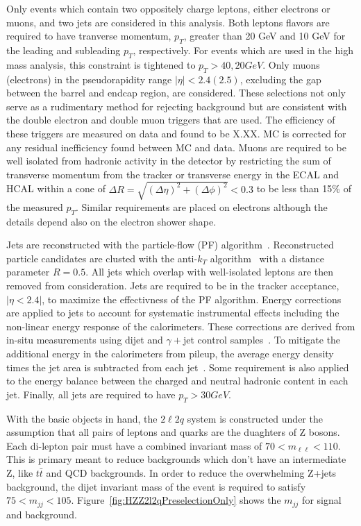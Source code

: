 Only events which contain two oppositely charge leptons, either electrons or
muons, and two jets are considered in this analysis.  Both leptons
flavors are required to have tranverse momentum, $p_T$, greater than 20 GeV
and 10 GeV for the leading and subleading $p_T$, respectively.  For events 
which are used in the high mass analysis, this constraint is tightened to 
$p_T>40, 20 GeV$.  Only muons (electrons) in the pseudorapidity range 
$|\eta|<2.4 (2.5)$, excluding the gap between the barrel and endcap region, 
are considered.  These selections not only serve as a rudimentary method for
rejecting background but are consistent with the double electron and 
double muon triggers that are used.  The efficiency of these triggers are 
measured on data and found to be X.XX.  MC is corrected for any residual 
inefficiency found between MC and data. Muons are required to be well 
isolated from hadronic activity in the detector by restricting the sum of
transverse momentum from the tracker or transverse energy in the ECAL and
HCAL within a cone of $\Delta R  = \sqrt{(\Delta\eta)^2+(\Delta\phi)^2}<0.3$
to be less than 15\% of the measured $p_T$.  Similar requirements are placed
on electrons although the details depend also on the electron shower shape.

Jets are reconstructed with the particle-flow (PF) algorithm~\cite{???}.
Reconstructed particle  candidates are clusted with the anti-$k_T$ 
algorithm~\cite{???} with a distance parameter $R=0.5$.  All jets which 
overlap with well-isolated leptons are then removed from consideration.  
Jets are required to be in the tracker acceptance, $|\eta<2.4|$, to maximize
the effectivness of the PF algorithm.  Energy corrections  are applied
to jets to account for systematic instrumental effects including the 
non-linear energy response of the calorimeters.  These corrections are 
derived from in-situ measurements using dijet and $\gamma+$jet control
samples~\cite{???}. To mitigate the additional energy in the calorimeters 
from pileup, the average energy density times the jet area is subtracted 
from each jet~\cite{???}.  Some requirement is also applied to the energy
balance between the charged and neutral hadronic content in each jet.  
Finally, all jets are required to have $p_T>30 GeV$.

With the basic objects in hand, the $2\ell2q$ system is constructed under
the assumption that all pairs of leptons and quarks are the duaghters of
Z bosons.  Each di-lepton pair must have a combined invariant mass of 
$70 < m_{\ell\ell} < 110$.  This is primary meant to reduce backgrounds which
don't have an intermediate Z, like $t\bar{t}$ and QCD backgrounds.  In order 
to reduce the overwhelming Z+jets background, the dijet invariant mass of 
the event is required to satisfy $75 < m_{jj} < 105$.  Figure~\ref{fig:HZZ2l2qPreselectionOnly} shows the $m_{jj}$ for signal and background.  

